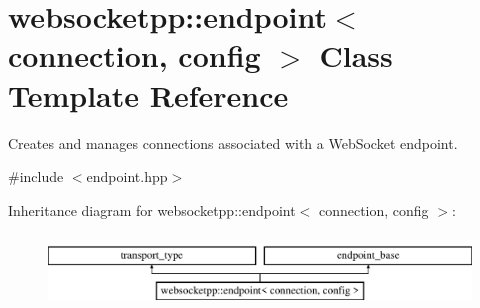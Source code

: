\hypertarget{classwebsocketpp_1_1endpoint}{}\section{websocketpp\+:\+:endpoint$<$ connection, config $>$ Class Template Reference}
\label{classwebsocketpp_1_1endpoint}


Creates and manages connections associated with a Web\+Socket endpoint.  




{\ttfamily \#include $<$endpoint.\+hpp$>$}

Inheritance diagram for websocketpp\+:\+:endpoint$<$ connection, config $>$\+:\begin{figure}[H]
\begin{center}
\leavevmode
\includegraphics[height=2.000000cm]{classwebsocketpp_1_1endpoint}
\end{center}
\end{figure}
